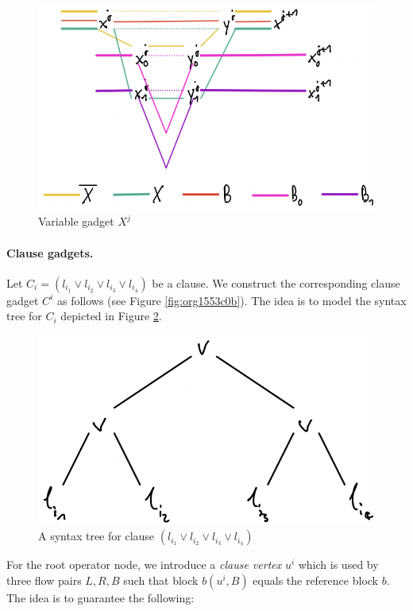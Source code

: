 \documentclass[fontsize=11pt,paper=a4]{book}
\begin{document}
\begin{figure}[htbp]
\centering
\includegraphics[width=.9\linewidth]{../assets/Screen Shot 2023-02-14 at 15.06.35.png}
\caption{\label{fig:org3611eea}Variable gadget \(X^j\)}
\end{figure}

\paragraph{Clause gadgets.}
Let \(C_i=(l_{i_1}\vee l_{i_2}\vee l_{i_3}\vee l_{i_4})\) be a clause.
We construct the corresponding clause gadget \(C^i\) as follows (see Figure \ref{fig:org1553c0b}).
The idea is to model the syntax tree for \(C_i\) depicted in Figure \ref{fig:org53c50df}.

\begin{figure}[htbp]
\centering
\includegraphics[width=.9\linewidth]{../assets/Screen Shot 2023-02-14 at 15.05.37.png}
\caption{\label{fig:org53c50df}A syntax tree for clause \((l_{i_1}\vee l_{i_2}\vee l_{i_3}\vee l_{i_4})\)}
\end{figure}

For the root operator node, we introduce a \emph{clause vertex} \(u^i\) which is used by three flow pairs \(L,R,B\) such that block \(b(u^i,B)\) equals the reference block \(b\).
The idea is to guarantee the following:
\end{document}
